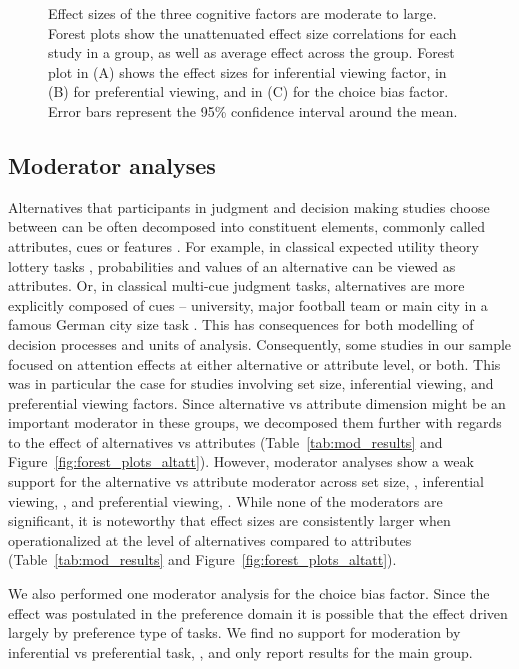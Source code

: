 \documentclass[english,natbib,man,floatsintext]{apa6}
\begin{document}
\begin{figure}
\centering
\caption{Effect sizes of the three cognitive factors are moderate to large. Forest plots show the unattenuated effect size correlations for each study in a group, as well as average effect across the group. Forest plot in (A) shows the effect sizes for inferential viewing factor, in (B) for preferential viewing, and in (C) for the choice bias factor. Error bars represent the 95\% confidence interval around the mean.}
\label{fig:forest_plots_cognitive}
\end{figure}


\subsection{Moderator analyses}

Alternatives that participants in judgment and decision making studies choose between can be often decomposed into constituent elements, commonly called attributes, cues or features \citep{payne1988,tversky1972elimination,stojic2020s,gigerenzer1996reasoning,schulz2018putting,hogarth2007heuristic}. For example, in classical expected utility theory lottery tasks \citep{tversky1979}, probabilities and values of an alternative can be viewed as attributes. Or, in classical multi-cue judgment tasks, alternatives are more explicitly composed of cues -- university, major football team or main city in a famous German city size task \citep{gigerenzer1996reasoning}. This has consequences for both modelling of decision processes and units of analysis. Consequently, some studies in our sample focused on attention effects at either alternative or attribute level, or both. This was in particular the case for studies involving set size, inferential viewing, and preferential viewing factors. Since alternative vs attribute dimension might be an important moderator in these groups, we decomposed them further with regards to the effect of alternatives vs attributes (Table~\ref{tab:mod_results} and Figure~\ref{fig:forest_plots_altatt}). However, moderator analyses show a weak support for the alternative vs attribute moderator across set size, , inferential viewing, , and preferential viewing, . While none of the moderators are significant, it is noteworthy that effect sizes are consistently larger when operationalized at the level of alternatives compared to attributes (Table~\ref{tab:mod_results} and Figure~\ref{fig:forest_plots_altatt}). 

We also performed one moderator analysis for the choice bias factor. Since the effect was postulated in the preference domain it is possible that the effect driven largely by preference type of tasks. We find no support for moderation by inferential vs preferential task, , and only report results for the main group. 
\end{document}
